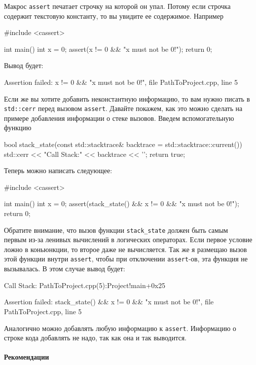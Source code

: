 Макрос \verb"assert" печатает строчку на которой он упал.
Потому если строчка содержит текстовую константу, то вы увидите ее содержимое.
Например
\begin{cppcode}
#include <cassert>

int main() {
  int x = 0;
  assert(x != 0 && "x must not be 0!");
  return 0;
}
\end{cppcode}
Вывод будет:
\begin{cppcode}
Assertion failed: x != 0 && "x must not be 0!", file PathToProject\main.cpp, line 5
\end{cppcode}
Если же вы хотите добавить неконстантную информацию, то вам нужно писать в \verb"std::cerr" перед вызовом \verb"assert".
Давайте покажем, как это можно сделать на примере добавления информации о стеке вызовов.
Введем вспомогательную функцию
\begin{cppcode}
bool stack_state(const std::stacktrace& backtrace = std::stacktrace::current()) {
  std::cerr << "Call Stack:\n" << backtrace << '\n';
  return true;
}
\end{cppcode}
Теперь можно написать следующее:
\begin{cppcode}
#include <cassert>

int main() {
  int x = 0;
  assert(stack_state() && x != 0 && "x must not be 0!");
  return 0;
}
\end{cppcode}
Обратите внимание, что вызов функции \verb"stack_state" должен быть самым первым из-за ленивых вычислений в логических операторах.
Если первое условие ложно в коньюнкции, то второе даже не вычисляется.
Так же я размещаю вызов этой функции внутри \verb"assert", чтобы при отключении \verb"assert"-ов, эта функция не вызывалась.
В этом случае вывод будет:
\begin{cppcode}
Call Stack:
PathToProject\main.cpp(5):Project!main+0x25

Assertion failed: stack_state() && x != 0 && "x must not be 0!",
file PathToProject\main.cpp, line 5
\end{cppcode}
Аналогично можно добавлять любую информацию к \verb"assert".
Информацию о строке кода добавлять не надо, так как она и так выводится.

\paragraph{Рекомендации}

